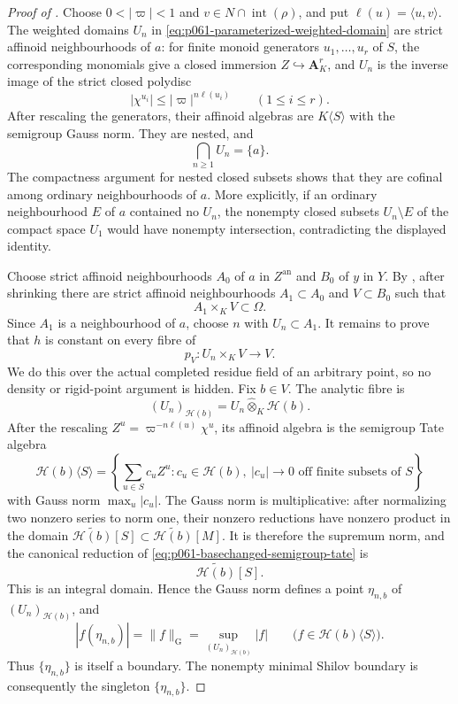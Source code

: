 \begin{proof}[Proof of
]
Choose \(0<|\varpi|<1\) and
\(v\in N\cap\operatorname{int}(\rho)\), and put
\(\ell(u)=\langle u,v\rangle\).  The weighted domains \(U_n\) in
\eqref{eq:p061-parameterized-weighted-domain} are strict affinoid
neighbourhoods of \(a\): for finite monoid generators
\(u_1,\ldots,u_r\) of \(S\), the corresponding monomials give a closed
immersion \(Z\hookrightarrow\mathbf A_K^r\), and \(U_n\) is the inverse
image of the strict closed polydisc
\[
             |\chi^{u_i}|\leq
             |\varpi|^{n\ell(u_i)}
             \qquad(1\leq i\leq r).
\]
After rescaling the generators, their affinoid algebras are
\(K\langle S\rangle\) with the semigroup Gauss norm.  They are nested,
and
\[
                         \bigcap_{n\geq1}U_n=\{a\}.
\]
The compactness argument for nested closed subsets shows that they are
cofinal among ordinary neighbourhoods of \(a\).  More explicitly, if an
ordinary neighbourhood \(E\) of \(a\) contained no \(U_n\), the nonempty
closed subsets \(U_n\setminus E\) of the compact space \(U_1\) would have
nonempty intersection, contradicting the displayed identity.

Choose strict affinoid neighbourhoods \(A_0\) of \(a\) in
\(Z^{\mathrm{an}}\) and \(B_0\) of \(y\) in \(Y\).  By
, after shrinking there are strict
affinoid neighbourhoods \(A_1\subset A_0\) and \(V\subset B_0\) such
that
\[
                         A_1\times_KV\subset\Omega.
\]
Since \(A_1\) is a neighbourhood of \(a\), choose \(n\) with
\(U_n\subset A_1\).  It remains to prove that \(h\) is constant on every
fibre of
\[
                    p_V:U_n\times_KV\longrightarrow V.
\]
We do this over the actual completed residue field of an arbitrary point,
so no density or rigid-point argument is hidden.  Fix \(b\in V\).  The
analytic fibre is
\[
 (U_n)_{\mathscr H(b)}=
 U_n\widehat\otimes_K\mathscr H(b).
\]
After the rescaling
\(Z^u=\varpi^{-n\ell(u)}\chi^u\), its affinoid algebra is the semigroup
Tate algebra
\begin{equation}
\label{eq:p061-basechanged-semigroup-tate}
 \mathscr H(b)\langle S\rangle=
 \left\{\sum_{u\in S}c_uZ^u:
 c_u\in\mathscr H(b),\ |c_u|\longrightarrow0
 \text{ off finite subsets of }S\right\}
\end{equation}
with Gauss norm \(\max_u|c_u|\).  The Gauss norm is multiplicative: after
normalizing two nonzero series to norm one, their nonzero reductions have
nonzero product in the domain
\(\widetilde{\mathscr H(b)}[S]\subset
 \widetilde{\mathscr H(b)}[M]\).  It is therefore the supremum norm, and
the canonical reduction of \eqref{eq:p061-basechanged-semigroup-tate} is
\[
                       \widetilde{\mathscr H(b)}[S].
\]
This is an integral domain.  Hence
the Gauss norm defines a point \(\eta_{n,b}\) of
\((U_n)_{\mathscr H(b)}\), and
\[
        |f(\eta_{n,b})|=\lVert f\rVert_{\mathrm G}
                       =\sup_{(U_n)_{\mathscr H(b)}}|f|
        \qquad
        \bigl(f\in\mathscr H(b)\langle S\rangle\bigr).
\]
Thus \(\{\eta_{n,b}\}\) is itself a boundary.  The nonempty minimal
Shilov boundary is consequently the singleton
\(\{\eta_{n,b}\}\).


\end{proof}
